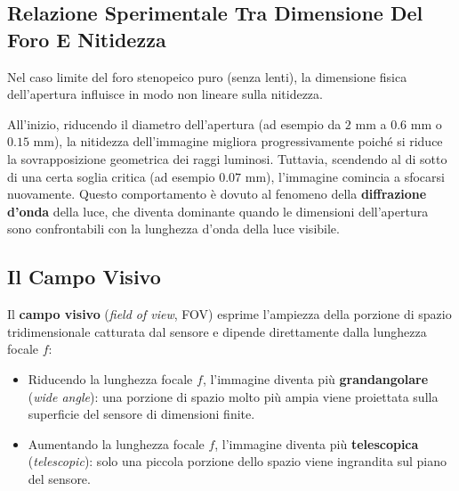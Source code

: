 ﻿\documentclass[11pt, a4paper]{article}
\begin{document}
\subsection{Relazione Sperimentale Tra Dimensione Del Foro E Nitidezza}

Nel caso limite del foro stenopeico puro (senza lenti), la dimensione fisica dell'apertura influisce in modo non lineare sulla nitidezza.


All'inizio, riducendo il diametro dell'apertura (ad esempio da $2\text{ mm}$ a $0.6\text{ mm}$ o $0.15\text{ mm}$), la nitidezza dell'immagine migliora progressivamente poiché si riduce la sovrapposizione geometrica dei raggi luminosi. Tuttavia, scendendo al di sotto di una certa soglia critica (ad esempio $0.07\text{ mm}$), l'immagine comincia a sfocarsi nuovamente. Questo comportamento è dovuto al fenomeno della \textbf{diffrazione d'onda} della luce, che diventa dominante quando le dimensioni dell'apertura sono confrontabili con la lunghezza d'onda della luce visibile.



\subsection{Il Campo Visivo}

Il \textbf{campo visivo} (\emph{field of view}, FOV) esprime l'ampiezza della porzione di spazio tridimensionale catturata dal sensore e dipende direttamente dalla lunghezza focale $f$:


\begin{itemize}[noitemsep]
    \item Riducendo la lunghezza focale $f$, l'immagine diventa più \textbf{grandangolare} (\emph{wide angle}): una porzione di spazio molto più ampia viene proiettata sulla superficie del sensore di dimensioni finite.
    \item Aumentando la lunghezza focale $f$, l'immagine diventa più \textbf{telescopica} (\emph{telescopic}): solo una piccola porzione dello spazio viene ingrandita sul piano del sensore.
\end{itemize}
\end{document}
